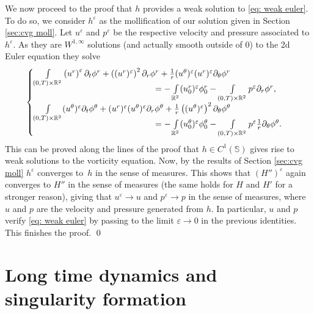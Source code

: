 \documentclass[JEP,XML,SOM,Unicode,NoFloatCountersInSection,published]{cedram}
\let\epsilon\varepsilon
\theoremstyle{plain}
\theoremstyle{definition}
\let\eps\epsilon
\newcommand{\bbS}{\mathbb S}
\begin{document}
We now proceed to the proof that $h$ provides a weak solution to \eqref{eq: weak euler}. To do so, we consider $h^\epsilon$ as the mollification of our solution given in Section \ref{sec:cvg moll}. Let $u^\epsilon$ and $p^\epsilon$ be the respective velocity and pressure associated to $h^\epsilon$. As they are $W^{1,\infty}$ solutions (and actually smooth outside of $0$) to the 2d Euler equation they solve
\[
\begin{cases} \int\limits_{(0,T)\times\mathbb{R}^2}\left(u^r \right)^\epsilon\partial_t\phi^r+\left((u^r)^\epsilon\right)^2 \partial_r \phi^r+\frac{1}{r}(u^\theta)^{\epsilon} (u^r)^{\epsilon} \partial_\theta \phi^r\\[-5pt]
\hspace*{5cm}=-\int\limits_{\mathbb{R}^2}(u^r_0)^{\epsilon}\phi^r_0-\int\limits_{(0,T)\times\mathbb{R}^2} p^\epsilon \partial_r \phi^r,\\
\int\limits_{(0,T)\times\mathbb{R}^2}(u^\theta)^{\epsilon} \partial_t\phi^\theta+(u^r)^{\epsilon} (u^\theta)^{\epsilon} \partial_r \phi^\theta+\frac{1}{r}\left((u^\theta)^{\epsilon}\right)^2 \partial_\theta \phi^\theta\\[-5pt]
\hspace*{5cm}=-\int\limits_{\mathbb{R}^2}(u^\theta_0)^\epsilon \phi^\theta_0-\int\limits_{(0,T)\times\mathbb{R}^2} p^\epsilon \frac{1}{r}\partial_\theta \phi^\theta.
\end{cases}
\]
This can be proved along the lines of the proof that $h \in C^1(\bbS)$ gives rise to weak solutions to the vorticity equation.
Now, by the results of Section \ref{sec:cvg moll} $h^\epsilon$ converges to~$h$ in the sense of measures. This shows that $(H'')^\epsilon$ again converges to $H''$ in the sense of measures (the same holds for $H$ and $H'$ for a stronger reason), giving that $u^\epsilon \to u$ and $p^\epsilon \to p$ in the sense of measures, where $u$ and $p$ are the velocity and pressure generated from $h$. In particular, $u$ and $p$ verify \eqref{eq: weak euler} by passing to the limit $\eps\to 0$ in the previous identities. This finishes the proof. \qed

\section{Long time dynamics and singularity formation}\label{sec:longtime}

\end{document}

